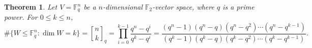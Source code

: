 \documentclass{article}
\newtheorem{theorem}{Theorem}
\theoremstyle{definition}
\newcommand{\F}{\mathbb{F}}
\newcommand{\qbinom}[2]{\genfrac{[}{]}{0pt}{}{#1}{#2}_q}
\begin{document}

\begin{tcolorbox}[colback=white, colframe=axiomcolor,title={\textbf{}}]
\begin{theorem}
Let \(V=\F_q^n\) be a $n$-dimensional $\F_2$-vector space, where \(q\) is a prime power. For \(0\le k\le n\),
\[
\#\{W\leq \F_q^n : \dim W = k\}
=
\qbinom{n}{k}
=
\prod_{i=0}^{k-1}\frac{q^n-q^i}{q^k-q^i}
=
\frac{(q^n-1)(q^n-q)(q^n-q^2)\cdots(q^n-q^{k-1})}{(q^k-1)(q^k-q)(q^k-q^2)\cdots(q^k-q^{k-1})}.
\]
\end{theorem}
\end{tcolorbox}

%
%
	
\end{document}
